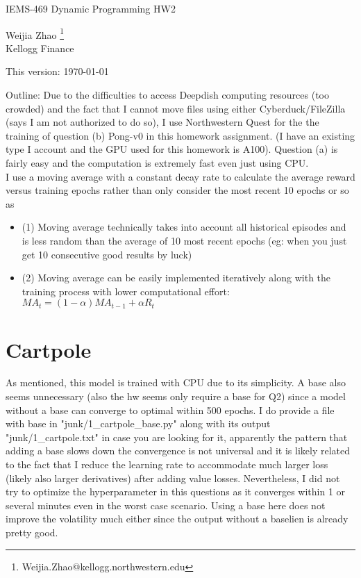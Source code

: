 \documentclass[12pt,letterpaper]{article}
\begin{document}
\begin{center}
\large IEMS-469 Dynamic Programming  HW2

\bigskip
Weijia Zhao \footnote{Weijia.Zhao@kellogg.northwestern.edu}\\
Kellogg Finance

\bigskip
This version: \today
\end{center}

\newpage
Outline: Due to the difficulties to access Deepdish computing resources (too crowded) and the fact that I cannot move files using either Cyberduck/FileZilla (says I am not authorized to do so), I use Northwestern Quest for the the training of question (b) Pong-v0 in this homework assignment. (I have an existing type I account and the GPU used for this homework is A100). Question (a) is fairly easy and the computation is extremely fast even just using CPU.\\

I use a moving average with a constant decay rate to calculate the average reward versus training epochs rather than only consider the most recent 10 epochs or so as
\begin{itemize}
\item (1) Moving average technically takes into account all historical episodes and is less random than the average of 10 most recent epochs (eg: when you just get 10 consecutive good results by luck)
\item (2) Moving average can be easily implemented iteratively along with the training process with lower computational effort: $MA_t=(1-\alpha)MA_{t-1}+\alpha R_t$
\end{itemize}

\section{Cartpole}
As mentioned, this model is trained with CPU due to its simplicity. A base also seems unnecessary (also the hw seems only require a base for Q2) since a model without a base can converge to optimal within 500 epochs. I do provide a file with base in "junk/1\_cartpole\_base.py" along with its output "junk/1\_cartpole.txt" in case you are looking for it, apparently the pattern that adding a base slows down the convergence is not universal and it is likely related to the fact that I reduce the learning rate to accommodate much larger loss (likely also larger derivatives) after adding value losses. Nevertheless, I did not try to optimize the hyperparameter in this questions as it converges within 1 or several minutes even in the worst case scenario. Using a base here does not improve the volatility much either since the output without a baselien is already pretty good.\\
\end{document}
